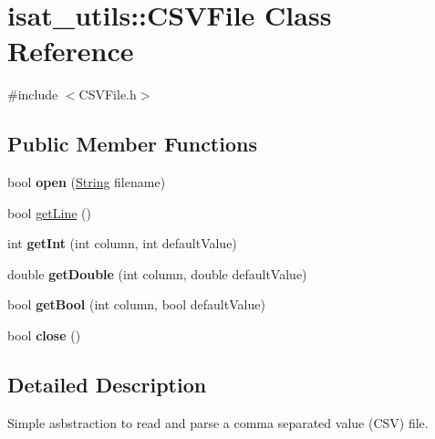 \hypertarget{classisat__utils_1_1_c_s_v_file}{}\section{isat\+\_\+utils\+:\+:C\+S\+V\+File Class Reference}
\label{classisat__utils_1_1_c_s_v_file}


{\ttfamily \#include $<$C\+S\+V\+File.\+h$>$}

\subsection*{Public Member Functions}
\begin{DoxyCompactItemize}
\item 
bool {\bfseries open} (\hyperlink{classisat__utils_1_1_string}{String} filename)\hypertarget{classisat__utils_1_1_c_s_v_file_a991bc05745a6fe746c1a7da8b977db73}{}\label{classisat__utils_1_1_c_s_v_file_a991bc05745a6fe746c1a7da8b977db73}

\item 
bool \hyperlink{classisat__utils_1_1_c_s_v_file_af56251c0c090c574631137f7e424ae15}{get\+Line} ()
\item 
int {\bfseries get\+Int} (int column, int default\+Value)\hypertarget{classisat__utils_1_1_c_s_v_file_adf3fb9b1a9d6485a29fe130feab4cd29}{}\label{classisat__utils_1_1_c_s_v_file_adf3fb9b1a9d6485a29fe130feab4cd29}

\item 
double {\bfseries get\+Double} (int column, double default\+Value)\hypertarget{classisat__utils_1_1_c_s_v_file_a0da5fed556adaf00b7ebab7845206269}{}\label{classisat__utils_1_1_c_s_v_file_a0da5fed556adaf00b7ebab7845206269}

\item 
bool {\bfseries get\+Bool} (int column, bool default\+Value)\hypertarget{classisat__utils_1_1_c_s_v_file_a99e474ab83db4fa6b28121c33b6127af}{}\label{classisat__utils_1_1_c_s_v_file_a99e474ab83db4fa6b28121c33b6127af}

\item 
bool {\bfseries close} ()\hypertarget{classisat__utils_1_1_c_s_v_file_a5ebc0c933cee943ddc8e087752353cb2}{}\label{classisat__utils_1_1_c_s_v_file_a5ebc0c933cee943ddc8e087752353cb2}

\end{DoxyCompactItemize}


\subsection{Detailed Description}
Simple asbstraction to read and parse a comma separated value (C\+SV) file.

